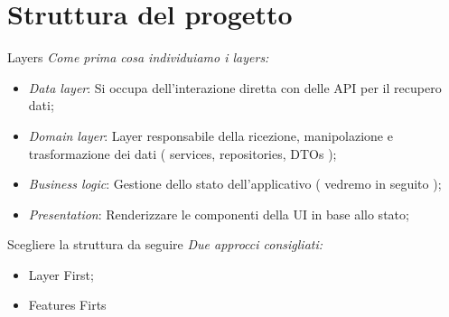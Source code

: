 \documentclass{../libs/presentation_format}
\begin{document}

\section{Struttura del progetto}
\begin{frame}{Layers}
	\emph{Come prima cosa individuiamo i layers:}
	\begin{itemize}
		\item \emph{Data layer}: Si occupa dell'interazione diretta con delle API per il recupero dati;
		\item \emph{Domain layer}: Layer responsabile della ricezione, manipolazione e trasformazione dei dati ( services, repositories, DTOs );
		\item \emph{Business logic}: Gestione dello stato dell'applicativo ( vedremo in seguito );
		\item \emph{Presentation}: Renderizzare le componenti della UI in base allo stato;
	\end{itemize}
\end{frame}


\begin{frame}{Scegliere la struttura da seguire}
	\emph{Due approcci consigliati:}
	\begin{itemize}
		\item Layer First;
		\item Features Firts
	\end{itemize}
\end{frame}

\end{document}
